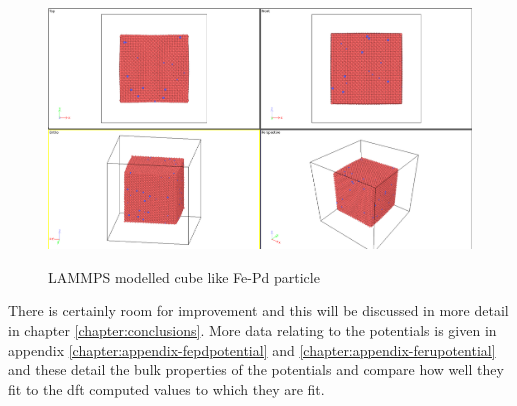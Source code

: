 \begin{figure}[htb]
\includegraphics[width=.94\linewidth]{chapters/potentials_fe_pd_ru/lammps/fepd_fct_cube_particle.png} 
\label{fig:fepd-lammps-trial}
\caption{LAMMPS modelled cube like Fe-Pd particle}
\end{figure}

There is certainly room for improvement and this will be discussed in more detail in chapter \ref{chapter:conclusions}.  More data relating to the potentials is given in appendix \ref{chapter:appendix-fepdpotential} and \ref{chapter:appendix-ferupotential} and these detail the bulk properties of the potentials and compare how well they fit to the \acrshort{dft} computed values to which they are fit.




